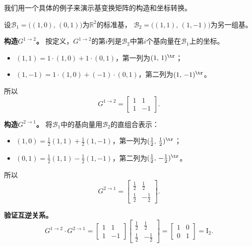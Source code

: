 \documentclass[12pt,UTF8,fontset=none]{ctexbook}
\begin{document}
我们用一个具体的例子来演示基变换矩阵的构造和坐标转换。

\begin{ex}\label{ex:4_4_1}
设$\mathcal{B}_1 = \big((1,0),\,(0,1)\big)$为$\mathbb{R}^2$的标准基，
$\mathcal{B}_2 = \big((1,1),\,(1,-1)\big)$为另一组基。

\textbf{构造$G^{1\rightarrow 2}$。}
按定义，$G^{1\rightarrow 2}$的第$i$列是$\mathcal{B}_2$中第$i$个基向量在$\mathcal{B}_1$上的坐标。
\begin{itemize}
\item $(1,1) = 1\cdot(1,0) + 1\cdot(0,1)$，第一列为$(1,\,1)^{\tr}$；
\item $(1,-1) = 1\cdot(1,0) + (-1)\cdot(0,1)$，第二列为$(1,\,-1)^{\tr}$。
\end{itemize}
所以
$$G^{1\rightarrow 2} = \begin{bmatrix} 1 & 1 \\ 1 & -1 \end{bmatrix}.$$

\textbf{构造$G^{2\rightarrow 1}$。}
将$\mathcal{B}_1$中的基向量用$\mathcal{B}_2$的直组合表示：
\begin{itemize}
\item $(1,0) = \frac{1}{2}(1,1) + \frac{1}{2}(1,-1)$，第一列为$(\frac{1}{2},\,\frac{1}{2})^{\tr}$；
\item $(0,1) = \frac{1}{2}(1,1) - \frac{1}{2}(1,-1)$，第二列为$(\frac{1}{2},\,-\frac{1}{2})^{\tr}$。
\end{itemize}
所以
$$G^{2\rightarrow 1} = \begin{bmatrix} \frac{1}{2} & \frac{1}{2} \\[2pt] \frac{1}{2} & -\frac{1}{2} \end{bmatrix}.$$

\textbf{验证互逆关系。}
$$G^{1\rightarrow 2}\cdot G^{2\rightarrow 1} = \begin{bmatrix} 1 & 1 \\ 1 & -1 \end{bmatrix}\begin{bmatrix} \frac{1}{2} & \frac{1}{2} \\[2pt] \frac{1}{2} & -\frac{1}{2} \end{bmatrix} = \begin{bmatrix} 1 & 0 \\ 0 & 1 \end{bmatrix} = \mathrm{I}_2. $$


\end{ex}
\end{document}
